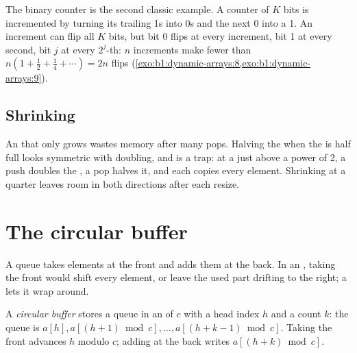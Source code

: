 The binary counter is the second classic example. A counter of $K$ bits is incremented by turning its trailing 1s into
0s and the next 0 into a 1. An increment can flip all $K$ bits, but bit 0 flips at every increment, bit 1 at every
second, bit $j$ at every $2^j$-th: $n$ increments make fewer than $n(1 + \frac12 + \frac14 + \cdots) = 2n$ flips
(\cref{exo:b1:dynamic-arrays:8,exo:b1:dynamic-arrays:9}).

\label{lst:b1:dynamic-arrays:counter}

\label{out:b1:dynamic-arrays:counter}

\subsection*{Shrinking}\label{sec:b1:dynamic-arrays:shrinking}

An  that only grows wastes memory after many pops. Halving the  when the  is half full looks
symmetric with doubling, and is a trap: at a  just above a power of 2, a push doubles the , a pop halves it,
and each copies every element. Shrinking at a quarter leaves room in both directions after each resize.

\label{out:b1:dynamic-arrays:thrash}

\section{The circular buffer}\label{sec:b1:dynamic-arrays:ring}

A queue takes elements at the front and adds them at the back. In an , taking the front would shift every element,
or leave the used part drifting to the right; a  lets it wrap around.

\begin{definition}\label{def:b1:dynamic-arrays:ring}
A \emph{circular buffer} stores a queue in an  of  $c$ with a head index $h$ and a
count $k$: the queue is $a[h], a[(h + 1) \bmod c], \dots, a[(h + k - 1) \bmod c]$. Taking the front advances $h$ modulo
$c$; adding at the back writes $a[(h + k) \bmod c]$.
\end{definition}

